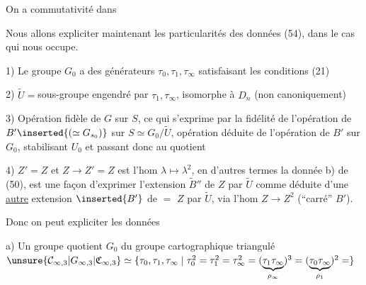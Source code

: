 On a commutativité dans


Nous allons expliciter maintenant les particularités des données (54), dans le cas qui nous occupe.

\noindent{}1) Le groupe $G_0$ a des générateurs $\tau_0,\tau_1,\tau_\infty$ satisfaisant les conditions (21)

2) $\widetilde U={}$sous-groupe engendré par $\tau_1,\tau_\infty$, isomorphe à $D_n$ (non canoniquement)

3) Opération fidèle de $G$ sur $S$, ce qui s'exprime par la fidélité de l'opération de $B'\inserted{(\simeq G_{s_0})}$ sur $S\simeq G_0/\widetilde U$, opération déduite de l'opération de $B'$ sur $G_0$, stabilisant $U_0$ et passant donc au quotient

4) $Z'=Z$ et $Z\longrightarrow Z'=Z$ est l'hom $\lambda\mapsto\lambda^2$, en d'autres termes la donnée b) de (50), est une façon d'exprimer l'extension $\widetilde B''$ de $Z$ par $\widetilde U$ comme déduite d'une \uline{autre} extension $\inserted{B'}$ de $=$ $Z$ par $\widetilde U$,  via l'hom $Z\longrightarrow Z^2$ (``carré''   $B'$).

Donc on peut expliciter les données 

\noindent{}a) Un groupe quotient $G_0$ du groupe cartographique triangulé $\unsure{\mathcal C_{\infty,3}|G_{\infty,3}|\mathfrak C_{\infty,3}}\simeq\{\tau_0,\tau_1,\tau_\infty\mid\tau_0^2=\tau_1^2=\tau_\infty^{2}=(\underbrace{\tau_1\tau_\infty}_{\rho_\infty})^3=(\underbrace{\tau_0\tau_\infty}_{\rho_1})^2=\}$

